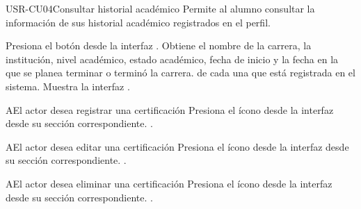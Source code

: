 \begin{UseCase}[]{USR-CU04}{Consultar historial académico}{
	Permite al alumno consultar la información de sus historial académico registrados en el perfil.
}
\end{UseCase}

\begin{UCtrayectoria}
	\UCpaso [\UCactor] Presiona el botón  desde la interfaz .
    \UCpaso [\UCsist] Obtiene el nombre de la carrera, la institución, nivel académico, estado académico, fecha de inicio y la fecha en la que se planea terminar o terminó la carrera. de cada una que está registrada en el sistema.
	\UCpaso [\UCsist] Muestra la interfaz .
\end{UCtrayectoria}

\begin{UCtrayectoriaA}{A}{El actor desea registrar una certificación}
	\UCpaso [\UCsist] Presiona el ícono \IUAgregar{} desde la interfaz  desde su sección correspondiente.
	.
\end{UCtrayectoriaA} 

\begin{UCtrayectoriaA}{A}{El actor desea editar una certificación}
	\UCpaso [\UCsist] Presiona el ícono \IUEditar{} desde la interfaz  desde su sección correspondiente.
	.
\end{UCtrayectoriaA} 

\begin{UCtrayectoriaA}{A}{El actor desea eliminar una certificación}
	\UCpaso [\UCsist] Presiona el ícono \IUEliminar{} desde la interfaz  desde su sección correspondiente.
	.
\end{UCtrayectoriaA} 